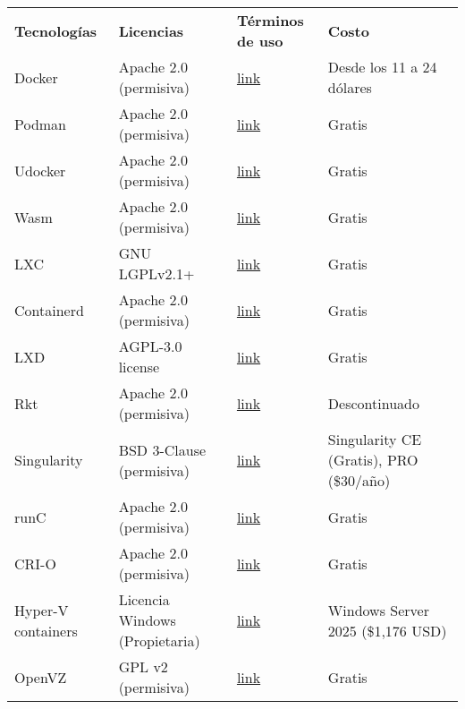 \begin{table}[H]
\centering
{}
\begin{tabularx}{\textwidth}{>{\raggedright\arraybackslash}X 
                                  >{\raggedright\arraybackslash}X 
                                  >{\raggedright\arraybackslash}X 
                                  >{\raggedright\arraybackslash}X}
\rowcolor{gray!30}
\textbf{Tecnologías} & \textbf{Licencias} & \textbf{Términos de uso} & \textbf{Costo} \\

Docker & Apache 2.0 (permisiva) & \href{https://www.docker.com/legal/docker-terms-service/}{link} & Desde los 11 a 24 dólares \\
Podman & Apache 2.0 (permisiva) & \href{https://github.com/containers/podman/blob/main/LICENSE}{link} & Gratis \\
Udocker & Apache 2.0 (permisiva) & \href{https://github.com/indigo-dc/udocker/blob/master/LICENSE}{link} & Gratis \\
Wasm & Apache 2.0 (permisiva) & \href{https://github.com/WebAssembly/design/blob/main/LICENSE}{link} & Gratis \\
LXC & GNU LGPLv2.1+ & \href{https://linuxcontainers.org/lxc/introduction/}{link} & Gratis \\
Containerd & Apache 2.0 (permisiva) & \href{https://github.com/containerd/containerd/blob/main/LICENSE}{link} & Gratis \\
LXD & AGPL-3.0 license & \href{https://github.com/canonical/lxd}{link} & Gratis \\
Rkt & Apache 2.0 (permisiva) & \href{https://github.com/rkt/rkt/blob/master/LICENSE}{link} & Descontinuado \\
Singularity & BSD 3-Clause (permisiva) & \href{https://github.com/sylabs/singularity/blob/main/LICENSE.md}{link} & Singularity CE (Gratis), PRO (\$30/año) \\
runC & Apache 2.0 (permisiva) & \href{https://github.com/opencontainers/runc/blob/main/LICENSE}{link} & Gratis \\
CRI-O & Apache 2.0 (permisiva) & \href{https://github.com/cri-o/cri-o/blob/main/LICENSE}{link} & Gratis \\
Hyper-V containers & Licencia Windows (Propietaria) & \href{https://learn.microsoft.com/es-es/virtualization/windowscontainers/images-eula}{link} & Windows Server 2025 (\$1,176 USD) \\
OpenVZ & GPL v2 (permisiva) & \href{https://openvz.org/}{link} & Gratis \\

\end{tabularx}
\end{table}
